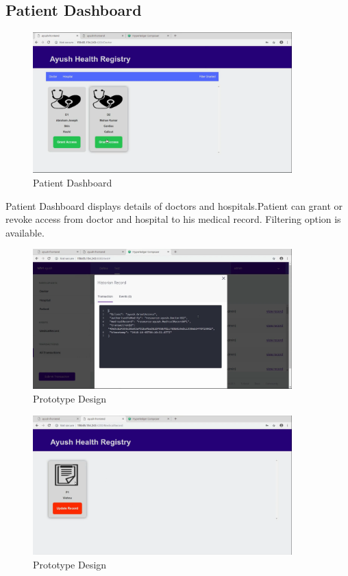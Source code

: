 \documentclass[11pt]{report}
\begin{document}
  \subsection{Patient Dashboard}  
    \begin{figure}
        \centering
        \includegraphics[scale=0.3,width=10cm]{Proto2.png}
        \caption{Patient Dashboard}
        \label{fig:my_label}
    \end{figure}
    Patient Dashboard displays details of doctors and hospitals.Patient can grant or revoke access from doctor and hospital to his medical record. Filtering option is available. 
    \begin{figure}
        \centering
        \includegraphics[scale=0.3,width=10cm]{Proto3.png}
        \caption{Prototype Design}
        \label{fig:my_label}
    \end{figure}
    \begin{figure}
        \centering
        \includegraphics[scale=0.3,width=10cm]{Proto4.png}
        \caption{Prototype Design}
        \label{fig:my_label}
    \end{figure}
\end{document}
